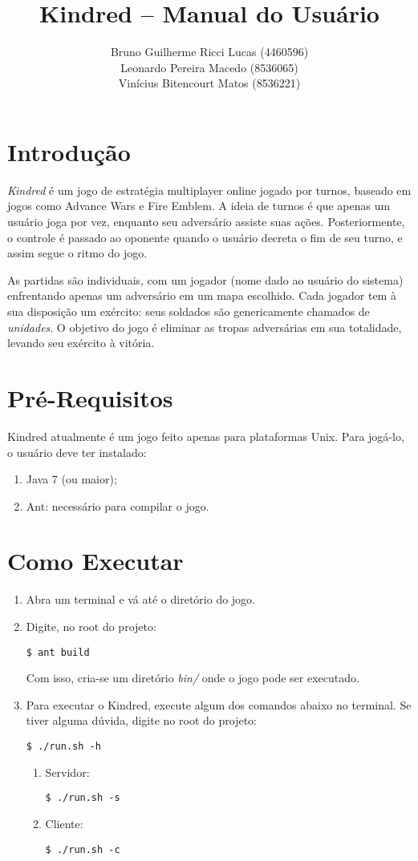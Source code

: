 \documentclass{article}
\title{
    Kindred -- Manual do Usuário
}
\author{
    Bruno Guilherme Ricci Lucas (4460596)\\
    Leonardo Pereira Macedo (8536065)\\
    Vinícius Bitencourt Matos (8536221)
}
\begin{document}
\maketitle

\section{Introdução}

\emph{Kindred} é um jogo de estratégia multiplayer online jogado por turnos, baseado em jogos como Advance Wars e Fire Emblem. A ideia de turnos é que apenas um usuário joga por vez, enquanto seu adversário assiste suas ações. Posteriormente, o controle é passado ao oponente quando o usuário decreta o fim de seu turno, e assim segue o ritmo do jogo. \par

As partidas são individuais, com um jogador (nome dado ao usuário do sistema) enfrentando apenas um adversário em um mapa escolhido. Cada jogador tem à sua disposição um exército: seus soldados são genericamente chamados de \emph{unidades}. O objetivo do jogo é eliminar as tropas adversárias em sua totalidade, levando seu exército à vitória.

\section{Pré-Requisitos}
Kindred atualmente é um jogo feito apenas para plataformas Unix. Para jogá-lo, o usuário deve ter instalado:
    \begin{enumerate}
        \item Java 7 (ou maior);
        \item Ant: necessário para compilar o jogo.
    \end{enumerate}

\section{Como Executar}
    \begin{enumerate}
    \item Abra um terminal e vá até o diretório do jogo.
    \item Digite, no root do projeto: \par
            \texttt{\$ ant build} \par
            Com isso, cria-se um diretório \emph{bin/} onde o jogo pode ser executado.
    \item Para executar o Kindred, execute algum dos comandos abaixo no terminal. Se tiver alguma dúvida, digite no root do projeto: \par
            \texttt{\$ ./run.sh -h} \par
        \begin{enumerate}
        \item Servidor: \par
                \texttt{\$ ./run.sh -s}
        \item Cliente: \par
                \texttt{\$ ./run.sh -c}
        \end{enumerate}
    \end{enumerate}
\end{document}

